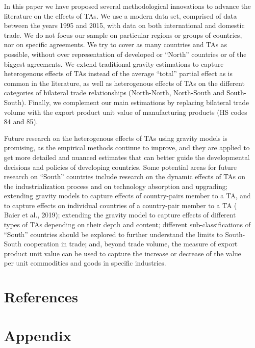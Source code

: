 \documentclass[12pt]{article}%
\begin{document}
In this paper we have proposed several methodological innovations to
advance the literature on the effects of TAs. We use a modern data set,
comprised of data between the years 1995 and 2015, with data on both
international and domestic trade. We do not focus our sample on
particular regions or groups of countries, nor on specific agreements.
We try to cover as many countries and TAs as possible, without over
representation of developed or ``North'' countries or of the biggest
agreements. We extend traditional gravity estimations to capture
heterogenous effects of TAs instead of the average ``total'' partial
effect as is common in the literature, as well as heterogenous effects
of TAs on the different categories of bilateral trade relationships
(North-North, North-South and South-South). Finally, we complement our
main estimations by replacing bilateral trade volume with the export
product unit value of manufacturing products (HS codes 84 and 85).

Future research on the heterogenous effects of TAs using gravity models
is promising, as the empirical methods continue to improve, and they are
applied to get more detailed and nuanced estimates that can better guide
the developmental decisions and policies of developing countries. Some
potential areas for future research on ``South'' countries include
research on the dynamic effects of TAs on the industrialization process
and on technology absorption and upgrading; extending gravity models to
capture effects of country-pairs member to a TA, and to capture effects
on individual countries of a country-pair member to a TA (\cite{baier_widely_2019} Baier et al.,
2019); extending the gravity model to capture effects of different types
of TAs depending on their depth and content; different
sub-classifications of ``South'' countries should be explored to further
understand the limits to South-South cooperation in trade; and, beyond
trade volume, the measure of export product unit value can be used to
capture the increase or decrease of the value per unit commodities and
goods in specific industries.

%
\newpage%
\section{References}%
\label{sec:References}%
\printbibliography

%
\newpage%
\section{Appendix}%
\label{sec:Appendix}%
\end{document}
